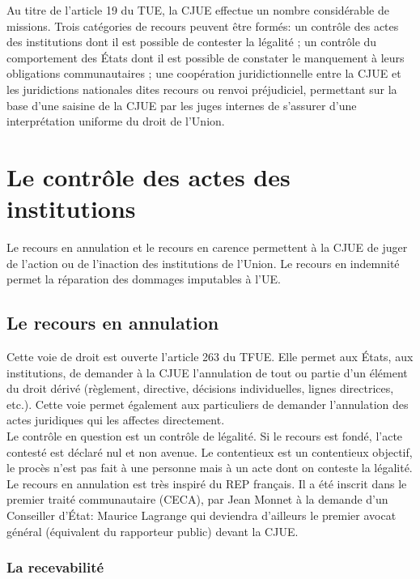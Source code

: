 \documentclass[10pt, a4paper, openany]{book}
\begin{document}
Au titre de l'article 19 du TUE, la CJUE effectue un nombre considérable de missions. Trois catégories de recours peuvent être formés: un contrôle des actes des institutions dont il est possible de contester la légalité ; un contrôle du comportement des États dont il est possible de constater le manquement à leurs obligations communautaires ; une coopération juridictionnelle entre la CJUE et les juridictions nationales dites recours ou renvoi préjudiciel, permettant sur la base d'une saisine de la CJUE par les juges internes de s'assurer d'une interprétation uniforme du droit de l'Union. 

\section{Le contrôle des actes des institutions}

Le recours en annulation et le recours en carence permettent à la CJUE de juger de l'action ou de l'inaction des institutions de l'Union. Le recours en indemnité permet la réparation des dommages imputables à l'UE. 

\subsection{Le recours en annulation}

Cette voie de droit est ouverte l'article 263 du TFUE. Elle permet aux États, aux institutions, de demander à la CJUE l'annulation de tout ou partie d'un élément du droit dérivé (règlement, directive, décisions individuelles, lignes directrices, etc.). Cette voie permet également aux particuliers de demander l'annulation des actes juridiques qui les affectes directement. \\
Le contrôle en question est un contrôle de légalité. Si le recours est fondé, l'acte contesté est déclaré nul et non avenue. Le contentieux est un contentieux objectif, le procès n'est pas fait à une personne mais à un acte dont on conteste la légalité. Le recours en annulation est très inspiré du REP français. Il a été inscrit dans le premier traité communautaire (CECA), par Jean Monnet à la demande d'un Conseiller d'État: Maurice Lagrange qui deviendra d'ailleurs le premier avocat général (équivalent du rapporteur public) devant la CJUE. 

\subsubsection{La recevabilité}
\end{document}
